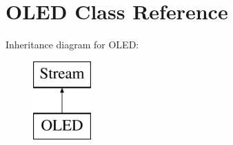 \hypertarget{class_o_l_e_d}{}\section{O\+L\+ED Class Reference}
\label{class_o_l_e_d}
Inheritance diagram for O\+L\+ED\+:\begin{figure}[H]
\begin{center}
\leavevmode
\includegraphics[height=3.000000cm]{class_o_l_e_d}
\end{center}
\end{figure}
